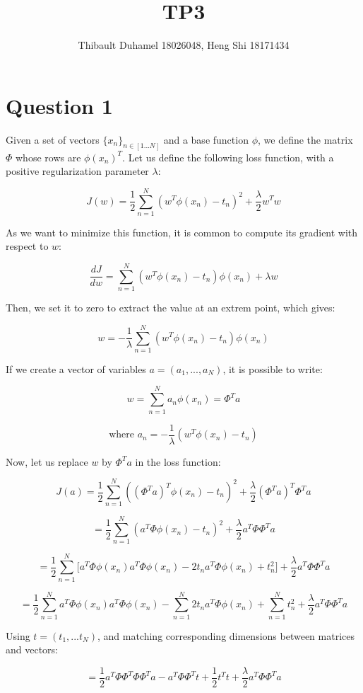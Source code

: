 \documentclass{article}
\title{TP3}
\author{Thibault Duhamel 18026048, Heng Shi 18171434 }
\begin{document}
\maketitle

\section*{Question 1}

Given a set of vectors $\{x_n\}_{n \in [1...N]}$ and a base function $\phi$, we define the matrix $\Phi$ whose rows are $\phi(x_n)^T$. Let us define the following loss function, with a positive regularization parameter $\lambda$:

$$ J(w) = \frac{1}{2}\sum_{n=1}^N{(w^T\phi(x_n) -t_n)^2} + \frac{\lambda}{2}w^T w$$

As we want to minimize this function, it is common to compute its gradient with respect to $w$:

$$ \frac{dJ}{dw} = \sum_{n=1}^N{(w^T\phi(x_n) -t_n)\phi(x_n)} + \lambda w$$

Then, we set it to zero to extract the value at an extrem point, which gives:

$$ w = -\frac{1}{\lambda}\sum_{n=1}^N{(w^T\phi(x_n) -t_n)\phi(x_n)}$$

If we create a vector of variables $a=(a_1, ..., a_N)$, it is possible to write: 

$$ w = \sum_{n=1}^N{a_n\phi(x_n)} = \Phi^T a$$

$$ \textrm{where } a_n=-\frac{1}{\lambda}(w^T\phi(x_n)-t_n) $$

Now, let us replace $w$ by $\Phi^T a$ in the loss function:

$$ J(a) = \frac{1}{2}\sum_{n=1}^N{((\Phi^T a)^T\phi(x_n) -t_n)^2} + \frac{\lambda}{2}(\Phi^T a)^T \Phi^T a$$

$$ = \frac{1}{2}\sum_{n=1}^N{(a^T\Phi\phi(x_n) -t_n)^2} + \frac{\lambda}{2}a^T \Phi \Phi^T a $$

$$ = \frac{1}{2}\sum_{n=1}^N{\Big[a^T\Phi\phi(x_n)a^T\Phi\phi(x_n) - 2 t_n a^T\Phi\phi(x_n) + t_n^2\Big]} + \frac{\lambda}{2}a^T \Phi \Phi^T a $$

$$ = \frac{1}{2}\sum_{n=1}^N{a^T\Phi\phi(x_n)a^T\Phi\phi(x_n)} - \sum_{n=1}^N{2 t_n a^T\Phi\phi(x_n)} + \sum_{n=1}^N{t_n^2} + \frac{\lambda}{2}a^T \Phi \Phi^T a $$

Using $t = (t_1, ... t_N)$, and matching corresponding dimensions between matrices and vectors:

$$ = \frac{1}{2}a^T\Phi\Phi^T\Phi\Phi^T a - a^T\Phi\Phi^T t + \frac{1}{2}t^T t + \frac{\lambda}{2} a^T \Phi \Phi^T a$$
\end{document}
